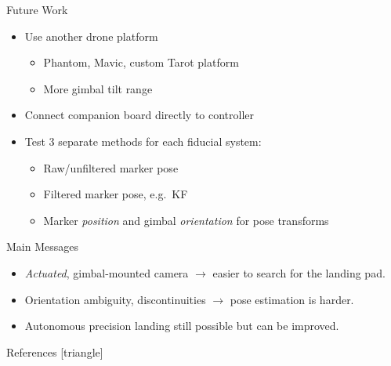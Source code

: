 \documentclass[aspectratio=169]{beamer}
\newif\ifpause
\newcommand{\mypause}{\ifpause \pause \fi}
\begin{document}
\begin{frame}{Future Work}
	\begin{itemize}
		\item Use another drone platform\mypause
		\begin{itemize}
			\item Phantom, Mavic, custom Tarot platform\mypause
			\item More gimbal tilt range
		\end{itemize}
			\mypause
		\item Connect companion board directly to controller
			\mypause
		\item Test 3 separate methods for each fiducial system:
			\mypause
		\begin{itemize}
			\item Raw/unfiltered marker pose
				\mypause
			\item Filtered marker pose, e.g.~KF
				\mypause
			\item Marker \emph{position} and gimbal \emph{orientation} for pose transforms
		\end{itemize}
	\end{itemize}
\end{frame}

\begin{frame}{Main Messages}
	\begin{itemize}
		\item \emph{Actuated}, gimbal-mounted camera
			\mypause $\rightarrow$ easier to search for the landing pad.
		\mypause\item Orientation ambiguity, discontinuities
			\mypause $\rightarrow$ pose estimation is harder.
		\mypause\item Autonomous precision landing still possible
			\mypause but can be improved.
	\end{itemize}
\end{frame}

\begin{frame}{References}
	[triangle]
	
	
\end{frame}

\end{document}
